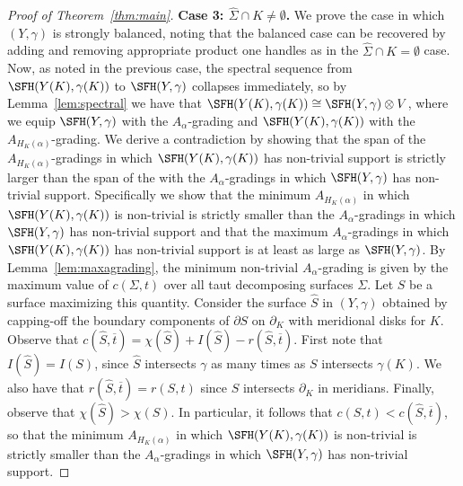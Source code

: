 \documentclass{amsart}
\theoremstyle{definition}
\theoremstyle{remark}
\numberwithin{equation}{section}
\begin{document}
\begin{proof}[Proof of Theorem~\ref{thm:main}]
 
  \noindent\textbf{Case 3: $\widehat{\Sigma}\cap K \neq \emptyset$.} We prove the case in which $(Y,\gamma)$ is strongly balanced, noting that the balanced case can be recovered by adding and removing appropriate product one handles as in the $\widehat{\Sigma}\cap K=\emptyset$ case. Now, as noted in the previous case, the spectral sequence from $\SFH(Y(K),\gamma(K))$ to $\SFH(Y,\gamma)$ collapses immediately, so by Lemma~\ref{lem:spectral} we have that $\SFH(Y(K),\gamma(K))\cong\SFH(Y,\gamma)\otimes V$, where we equip $\SFH(Y,\gamma)$ with the $A_\alpha$-grading and $\SFH(Y(K),\gamma(K))$ with the $A_{H_K(\alpha)}$-grading. We derive a contradiction by showing that the span of the $A_{H_K(\alpha)}$-gradings in which $\SFH(Y(K),\gamma(K))$ has non-trivial support is strictly larger than the span of the with the $A_\alpha$-gradings in which $\SFH(Y,\gamma)$ has non-trivial support. Specifically we show that the minimum $A_{H_K(\alpha)}$ in which $\SFH(Y(K),\gamma(K))$ is non-trivial is strictly smaller than the $A_\alpha$-gradings in which $\SFH(Y,\gamma)$ has non-trivial support and that the maximum $A_\alpha$-gradings in which $\SFH(Y(K),\gamma(K))$ has non-trivial support is at least as large as $\SFH(Y,\gamma)$. By Lemma~\ref{lem:maxagrading}, the minimum non-trivial $A_\alpha$-grading is given by the maximum value of $c(\Sigma,t)$ over all taut decomposing surfaces $\Sigma$. Let $S$ be a surface maximizing this quantity.  Consider the surface $\widehat{S}$ in $(Y,\gamma)$ obtained by capping-off the boundary components of $\partial S$ on $\partial_K$ with meridional disks for $K$. Observe that $c(\widehat{S},\overline{t})=\chi(\widehat{S})+I(\widehat{S})-r(\widehat{S},\overline{t})$. First note that $I(\widehat{S})=I(S)$, since $\widehat{S}$ intersects $\gamma$ as many times as $S$ intersects $\gamma(K)$.  We also have that $r(\widehat{S},\overline{t})=r(S,t)$ since $S$ intersects $\partial_K$ in meridians.  Finally, observe that $\chi(\widehat{S})>\chi(S)$. In particular, it follows that $c(S,t)< c(\widehat{S},\overline{t})$, so that the minimum $A_{H_K(\alpha)}$ in which $\SFH(Y(K),\gamma(K))$ is non-trivial is strictly smaller than the $A_\alpha$-gradings in which $\SFH(Y,\gamma)$ has non-trivial support.
  

\end{proof}
\end{document}
